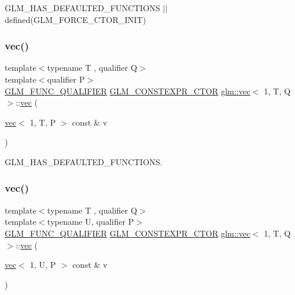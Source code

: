 G\+L\+M\+\_\+\+H\+A\+S\+\_\+\+D\+E\+F\+A\+U\+L\+T\+E\+D\+\_\+\+F\+U\+N\+C\+T\+I\+O\+NS $\vert$$\vert$ defined(\+G\+L\+M\+\_\+\+F\+O\+R\+C\+E\+\_\+\+C\+T\+O\+R\+\_\+\+I\+N\+I\+T) 

\mbox{\label{structglm_1_1vec_3_011_00_01_t_00_01_q_01_4_a65d7b47aa379986d75f0e64f7141f5d0}} 
\subsubsection{\texorpdfstring{vec()}{vec()}\hspace{0.1cm}{\footnotesize\ttfamily [10/14]}}
{\footnotesize\ttfamily template$<$typename T , qualifier Q$>$ \\
template$<$qualifier P$>$ \\
\hyperlink{setup_8hpp_a33fdea6f91c5f834105f7415e2a64407}{G\+L\+M\+\_\+\+F\+U\+N\+C\+\_\+\+Q\+U\+A\+L\+I\+F\+I\+ER} \hyperlink{setup_8hpp_ad34178a09666081abdb573c14d1f4a5a}{G\+L\+M\+\_\+\+C\+O\+N\+S\+T\+E\+X\+P\+R\+\_\+\+C\+T\+OR} \hyperlink{structglm_1_1vec}{glm\+::vec}$<$ 1, T, Q $>$\+::\hyperlink{structglm_1_1vec}{vec} (\begin{DoxyParamCaption}\item[{\hyperlink{structglm_1_1vec}{vec}$<$ 1, T, P $>$ const \&}]{v }\end{DoxyParamCaption})}



G\+L\+M\+\_\+\+H\+A\+S\+\_\+\+D\+E\+F\+A\+U\+L\+T\+E\+D\+\_\+\+F\+U\+N\+C\+T\+I\+O\+NS. 

\mbox{\label{structglm_1_1vec_3_011_00_01_t_00_01_q_01_4_ab8d935770c08c100f574755cf3ab3206}} 
\subsubsection{\texorpdfstring{vec()}{vec()}\hspace{0.1cm}{\footnotesize\ttfamily [11/14]}}
{\footnotesize\ttfamily template$<$typename T , qualifier Q$>$ \\
template$<$typename U, qualifier P$>$ \\
\hyperlink{setup_8hpp_a33fdea6f91c5f834105f7415e2a64407}{G\+L\+M\+\_\+\+F\+U\+N\+C\+\_\+\+Q\+U\+A\+L\+I\+F\+I\+ER} \hyperlink{setup_8hpp_ad34178a09666081abdb573c14d1f4a5a}{G\+L\+M\+\_\+\+C\+O\+N\+S\+T\+E\+X\+P\+R\+\_\+\+C\+T\+OR} \hyperlink{structglm_1_1vec}{glm\+::vec}$<$ 1, T, Q $>$\+::\hyperlink{structglm_1_1vec}{vec} (\begin{DoxyParamCaption}\item[{\hyperlink{structglm_1_1vec}{vec}$<$ 1, U, P $>$ const \&}]{v }\end{DoxyParamCaption})}


